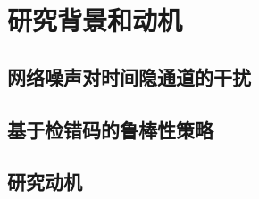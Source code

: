 \section{研究背景和动机}
\label{chap:hash:motivation}

\subsection{网络噪声对时间隐通道的干扰}
\label{chap:hash:motivation:noise}

\subsection{基于检错码的鲁棒性策略}
\label{chap:hash:motivation:robustness}

\subsection{研究动机}
\label{chap:hash:motivation:motivation}
